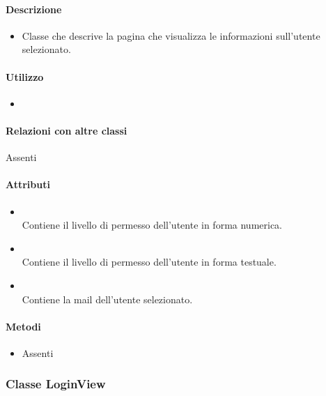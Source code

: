 \paragraph*{Descrizione}
\begin{itemize}
\item[] Classe che descrive la pagina che visualizza le informazioni sull'utente selezionato.
\end{itemize}

\paragraph*{Utilizzo}
\begin{itemize}
\item[] 
\end{itemize}

\paragraph*{Relazioni con altre classi}
Assenti

\paragraph*{Attributi}
\begin{itemize}
\item[]  \\ Contiene il livello di permesso dell'utente in forma numerica.
\item[]  \\ Contiene il livello di permesso dell'utente in forma testuale.
\item[]  \\ Contiene la mail dell'utente selezionato.
\end{itemize}

\paragraph*{Metodi}
\begin{itemize}
\item[] Assenti
\end{itemize}

\subsubsection{Classe LoginView}

